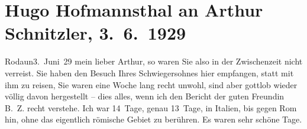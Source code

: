 

         
         \renewcommand{\erwaehntePersonen}{Personen: Arnoldo Cappellini, Berta Zuckerkandl}
         \renewcommand{\erwaehnteOrte}{Orte: Italien, Rodaun, Rom, Wien}
         \renewcommand{\erwaehnteWerke}{Werke: Der Weg ins Freie. Roman, Der einsame Weg. Schauspiel in fünf Akten, Dämmerseelen. Novellen, Fräulein Else, Lieutenant Gustl. Novelle}
               \section[Hugo Hofmannsthal an Arthur Schnitzler, 3. 6. 1929]{ Hugo Hofmannsthal an Arthur Schnitzler, 3. 6. 1929}\nopagebreak{}\rehead{ }\begin{ledgroupsized}[t]{13cm}\normalsize\beginnumbering \toendnotes[C]{\smallbreak\pagebreak[2]} 
\toendnotes[C]{\smallbreak}\pstart
           {\pb}Rodaun3. Juni 29\pend
           \pstart{}mein lieber Arthur, \pend\pstart
           so waren Sie also in der Zwischenzeit nicht verreist. Sie haben den Besuch Ihres Schwiegersohnes hier empfangen,
               statt mit ihm zu reisen,  Sie waren eine Woche
               lang recht unwohl, sind aber gottlob wieder völlig davon hergestellt – dies alles,
               wenn ich den Bericht der guten Freundin B. Z.
               recht verstehe.\pend
           \pstart
           Ich war 14 Tage, genau 13 Tage, in Italien, bis
               gegen Rom hin, ohne das eigentlich römische Gebiet zu berühren. Es waren sehr schöne Tage.\pend

\end{ledgroupsized}
